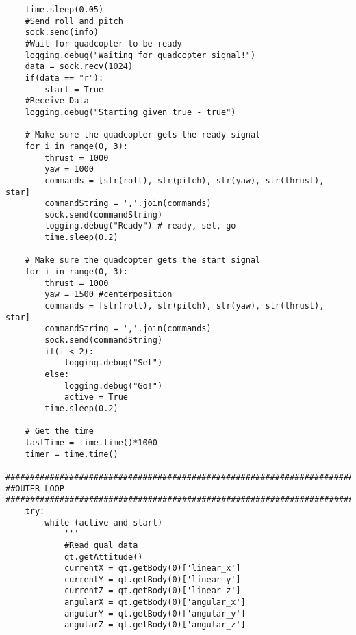 \begin{lstlisting}
    time.sleep(0.05)
    #Send roll and pitch
    sock.send(info)
    #Wait for quadcopter to be ready
    logging.debug("Waiting for quadcopter signal!")
    data = sock.recv(1024)
    if(data == "r"):
        start = True
    #Receive Data
    logging.debug("Starting given true - true")

    # Make sure the quadcopter gets the ready signal
    for i in range(0, 3):
        thrust = 1000
        yaw = 1000
        commands = [str(roll), str(pitch), str(yaw), str(thrust), star]
        commandString = ','.join(commands)
        sock.send(commandString)
        logging.debug("Ready") # ready, set, go
        time.sleep(0.2)
    
    # Make sure the quadcopter gets the start signal
    for i in range(0, 3):
        thrust = 1000
        yaw = 1500 #centerposition
        commands = [str(roll), str(pitch), str(yaw), str(thrust), star]
        commandString = ','.join(commands)
        sock.send(commandString)
        if(i < 2):
            logging.debug("Set")
        else: 
            logging.debug("Go!")
            active = True
        time.sleep(0.2)

    # Get the time
    lastTime = time.time()*1000
    timer = time.time()
    
##############################################################################
##OUTER LOOP
##############################################################################
    try:
        while (active and start)
            '''
            #Read qual data
            qt.getAttitude()
            currentX = qt.getBody(0)['linear_x']
            currentY = qt.getBody(0)['linear_y']
            currentZ = qt.getBody(0)['linear_z']
            angularX = qt.getBody(0)['angular_x']
            angularY = qt.getBody(0)['angular_y']
            angularZ = qt.getBody(0)['angular_z']


\end{lstlisting}
